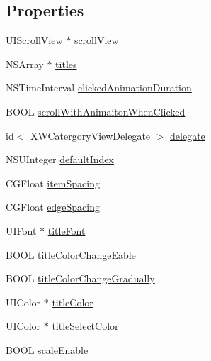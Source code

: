 \subsection*{Properties}
\begin{DoxyCompactItemize}
\item 
U\+I\+Scroll\+View $\ast$ \mbox{\hyperlink{interface_x_w_catergory_view_aee5b72818f7e19ebb009954d716b487d}{scroll\+View}}
\item 
N\+S\+Array $\ast$ \mbox{\hyperlink{interface_x_w_catergory_view_a03ccc6f73086a7e39dfacac686bb9970}{titles}}
\item 
N\+S\+Time\+Interval \mbox{\hyperlink{interface_x_w_catergory_view_a9a5844e5a2b203fc768463370359a061}{clicked\+Animation\+Duration}}
\item 
B\+O\+OL \mbox{\hyperlink{interface_x_w_catergory_view_a7ca7ff8e446bf607bc8aaa7cb1274b19}{scroll\+With\+Animaiton\+When\+Clicked}}
\item 
id$<$ X\+W\+Catergory\+View\+Delegate $>$ \mbox{\hyperlink{interface_x_w_catergory_view_a6affd565c27ae72d29544cada9ba9560}{delegate}}
\item 
N\+S\+U\+Integer \mbox{\hyperlink{interface_x_w_catergory_view_ac36d3000bf66aa472b45a62e526bd589}{default\+Index}}
\item 
C\+G\+Float \mbox{\hyperlink{interface_x_w_catergory_view_a1c79f150712300dacd764c537d435d8b}{item\+Spacing}}
\item 
C\+G\+Float \mbox{\hyperlink{interface_x_w_catergory_view_ae2c3113ad37a1400271cf1085026bd1f}{edge\+Spacing}}
\item 
U\+I\+Font $\ast$ \mbox{\hyperlink{interface_x_w_catergory_view_a02581f323e18f824b2d15b1259368cc0}{title\+Font}}
\item 
B\+O\+OL \mbox{\hyperlink{interface_x_w_catergory_view_aca52d3b3ada61e1a21f119d6aa445982}{title\+Color\+Change\+Eable}}
\item 
B\+O\+OL \mbox{\hyperlink{interface_x_w_catergory_view_a4ec94771278fa4d7375d24624f53d0bd}{title\+Color\+Change\+Gradually}}
\item 
U\+I\+Color $\ast$ \mbox{\hyperlink{interface_x_w_catergory_view_aab644e97aaef938278697b3575b64cc7}{title\+Color}}
\item 
U\+I\+Color $\ast$ \mbox{\hyperlink{interface_x_w_catergory_view_a1f6546bef59a2df6fa70e2965ce861ca}{title\+Select\+Color}}
\item 
B\+O\+OL \mbox{\hyperlink{interface_x_w_catergory_view_a97e3f7ff59346548f37d9b34833b5e0f}{scale\+Enable}}
\item 

\end{DoxyCompactItemize}
